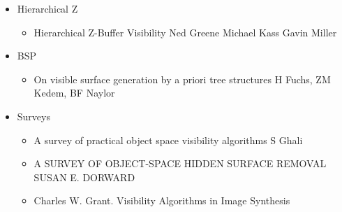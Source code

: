 \documentclass[review]{acmsiggraph}
\begin{document}
\begin{itemize}
\item Hierarchical Z
\begin{itemize}
\item Hierarchical Z-Buffer Visibility Ned Greene Michael Kass Gavin Miller
\end{itemize}
\item BSP
\begin{itemize}
\item On visible surface generation by a priori tree structures H Fuchs, ZM Kedem, BF Naylor
\end{itemize}
\item Surveys
\begin{itemize}
\item A survey of practical object space visibility algorithms  S Ghali
\item A SURVEY OF OBJECT-SPACE HIDDEN SURFACE REMOVAL SUSAN E. DORWARD
\item Charles W. Grant. Visibility Algorithms in Image Synthesis
\end{itemize}
\end{itemize}
\end{document}
